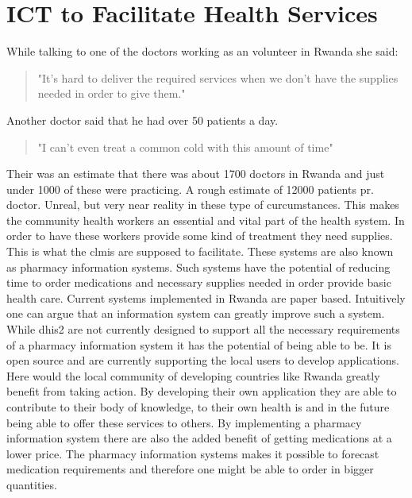 \section{ICT to Facilitate Health Services}
While talking to one of the doctors working as an volunteer in Rwanda she said:
\begin{quotation}
"It's hard to deliver the required services when we don't have the supplies needed in order to give them."
\end{quotation}
Another doctor said that he had over 50 patients a day. 
\begin{quotation}
"I can't even treat a common cold with this amount of time"
\end{quotation}
Their was an estimate that there was about 1700 doctors in Rwanda and just under 1000 of these were practicing.
A rough estimate of 12000 patients pr. doctor. 
Unreal, but very near reality in these type of curcumstances. 
This makes the community health workers an essential and vital part of the health system. 
In order to have these workers provide some kind of treatment they need supplies.
This is what the \gls{clmis} are supposed to facilitate. 
These systems are also known as pharmacy information systems. 
Such systems have the potential of reducing time to order medications and necessary supplies needed in order provide basic health care.
Current systems implemented in Rwanda are paper based. 
Intuitively one can argue that an information system can greatly improve such a system. 
While \gls{dhis2} are not currently designed to support all the necessary requirements of a pharmacy information system it has the potential of being able to be. 
It is open source and are currently supporting the local users to develop applications.
Here would the local community of developing countries like Rwanda greatly benefit from taking action.
By developing their own application they are able to contribute to their body of knowledge, to their own health \gls{is} and in the future being able to offer these services to others.
By implementing a pharmacy information system there are also the added benefit of getting medications at a lower price.
The pharmacy information systems makes it possible to forecast medication requirements and therefore one might be able to order in bigger quantities. 

